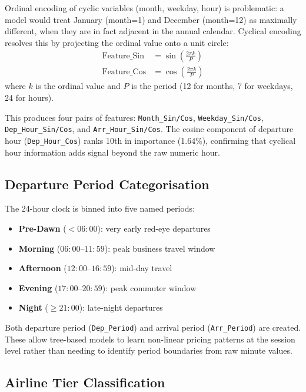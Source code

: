 \documentclass[12pt, a4paper]{article}
\begin{document}
Ordinal encoding of cyclic variables (month, weekday, hour) is problematic:
a model would treat January (month=1) and December (month=12) as maximally
different, when they are in fact adjacent in the annual calendar.  Cyclical
encoding resolves this by projecting the ordinal value onto a unit circle:
\begin{align}
    \text{Feature\_Sin} &= \sin\!\left(\frac{2\pi k}{P}\right) \\
    \text{Feature\_Cos} &= \cos\!\left(\frac{2\pi k}{P}\right)
\end{align}
where $k$ is the ordinal value and $P$ is the period
(12 for months, 7 for weekdays, 24 for hours).

This produces four pairs of features:
\texttt{Month\_Sin/Cos}, \texttt{Weekday\_Sin/Cos},
\texttt{Dep\_Hour\_Sin/Cos}, and \texttt{Arr\_Hour\_Sin/Cos}.
The cosine component of departure hour (\texttt{Dep\_Hour\_Cos}) ranks 10th
in importance (1.64\%), confirming that cyclical hour information adds signal
beyond the raw numeric hour.

\subsection{Departure Period Categorisation}

The 24-hour clock is binned into five named periods:
\begin{itemize}
    \item \textbf{Pre-Dawn} ($< 06{:}00$): very early red-eye departures
    \item \textbf{Morning} ($06{:}00$--$11{:}59$): peak business travel window
    \item \textbf{Afternoon} ($12{:}00$--$16{:}59$): mid-day travel
    \item \textbf{Evening} ($17{:}00$--$20{:}59$): peak commuter window
    \item \textbf{Night} ($\geq 21{:}00$): late-night departures
\end{itemize}

Both departure period (\texttt{Dep\_Period}) and arrival period
(\texttt{Arr\_Period}) are created.  These allow tree-based models to learn
non-linear pricing patterns at the session level rather than needing to
identify period boundaries from raw minute values.

\subsection{Airline Tier Classification}
\end{document}
